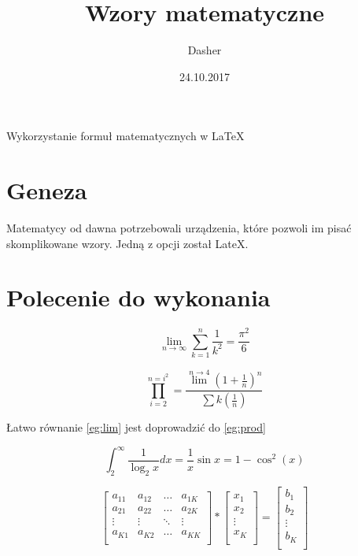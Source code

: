 \documentclass[a4paper,12pt]{article}
\title{Wzory matematyczne}
\author{Dasher}
\date{24.10.2017}
\begin{document}
\maketitle

Wykorzystanie formuł matematycznych w LaTeX

\tableofcontents

\section{Geneza}
Matematycy od dawna potrzebowali urządzenia, które pozwoli im pisać skomplikowane wzory. Jedną z opcji został LateX.

\section{Polecenie do wykonania}

\begin{equation}
\label{eg:lim}
\lim_{n \to \infty}
	\sum_{k=1}^n \frac{1}{k^2}
		= \frac{\pi^2}{6}
\end{equation}

\begin{equation}
\label{eg:prod}
\prod_{i=2}^{n=i^2}
	= \frac{\lim^{n \to 4}{(1+\frac{1}{n})^n}}{\sum k(\frac{1}{n})}
\end{equation}

Łatwo równanie \ref{eg:lim} jest doprowadzić do \ref{eg:prod}

\begin{equation}
\label{eg:int}
\int_{2}^{\infty} \frac{1}{\log_{2}x}dx= 
	\frac{1}{x}\sin{x}=1-\cos^2{(x)}
\end{equation}

\begin{equation}
\label{eg:array}
\left[ \begin{array}{cccc}
a_{11} & a_{12} & \ldots & a_{1K} \\
a_{21} & a_{22} & \ldots & a_{2K} \\
\vdots & \vdots & \ddots & \vdots \\
a_{K1} & a_{K2} & \ldots & a_{KK} \\
\end{array} \right]*
\left[ \begin{array}{c}
x_{1} \\
x_{2} \\
\vdots \\
x_{K} \\
\end{array} \right]=
\left[ \begin{array}{c}
b_{1} \\
b_{2} \\
\vdots \\
b_{K} \\
\end{array} \right]
\end{equation}
\end{document}
